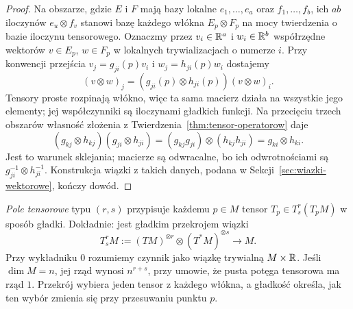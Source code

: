 \begin{proof}
Na obszarze, gdzie $E$ i $F$ mają bazy lokalne
$e_1,\ldots,e_a$ oraz $f_1,\ldots,f_b$, ich $ab$
iloczynów $e_u\otimes f_v$ stanowi bazę każdego włókna
$E_p\otimes F_p$ na mocy twierdzenia o bazie iloczynu
tensorowego. Oznaczmy przez $v_i\in\mathbb{R}^a$ i $w_i\in\mathbb{R}^b$
współrzędne wektorów $v\in E_p$, $w\in F_p$ w lokalnych
trywializacjach o numerze $i$. Przy konwencji przejścia
$v_j=g_{ji}(p)v_i$ i $w_j=h_{ji}(p)w_i$ dostajemy
\[
 (v\otimes w)_j=(g_{ji}(p)\otimes h_{ji}(p))(v\otimes w)_i.
\]
Tensory proste rozpinają włókno, więc ta sama macierz działa
na wszystkie jego elementy; jej współczynniki są iloczynami
gładkich funkcji. Na przecięciu
trzech obszarów własność złożenia z
Twierdzenia~\ref{thm:tensor-operatorow} daje
\[
 (g_{kj}\otimes h_{kj})(g_{ji}\otimes h_{ji})
   =(g_{kj}g_{ji})\otimes(h_{kj}h_{ji})
   =g_{ki}\otimes h_{ki}.
\]
Jest to warunek sklejania; macierze są odwracalne,
bo ich odwrotnościami są $g_{ji}^{-1}\otimes h_{ji}^{-1}$.
Konstrukcja wiązki z takich danych, podana w
Sekcji~\ref{sec:wiazki-wektorowe}, kończy dowód.
\end{proof}

\begin{definicja}
\label{def:pole-tensorowe}
\emph{Pole tensorowe} typu $(r,s)$ przypisuje każdemu
$p\in M$ tensor $T_p\in T^r_s(T_pM)$ w sposób gładki.
Dokładnie: jest gładkim przekrojem wiązki
\begin{equation}\label{eq:wiazka-tensorowa}
 T^r_s M:=(TM)^{\otimes r}\otimes(T^*M)^{\otimes s}
 \longrightarrow M.
\end{equation}
Przy wykładniku $0$ rozumiemy czynnik jako wiązkę
trywialną $M\times\mathbb{R}$.
Jeśli $\dim M=n$, jej rząd wynosi $n^{r+s}$, przy umowie,
że pusta potęga tensorowa ma rząd $1$. Przekrój wybiera
jeden tensor z każdego włókna, a gładkość określa, jak
ten wybór zmienia się przy przesuwaniu punktu $p$.
\end{definicja}

